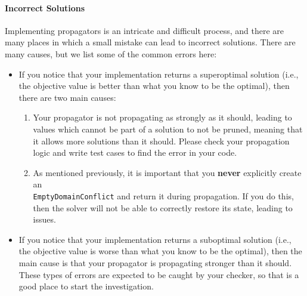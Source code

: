 \documentclass{article}
\begin{document}
    \paragraph*{Incorrect Solutions}
        Implementing propagators is an intricate and difficult process, and there are many places in which a small mistake can lead to incorrect solutions.
        There are many causes, but we list some of the common errors here:
        \begin{itemize}
            \item
                If you notice that your implementation returns a superoptimal solution (i.e., the objective value is better than what you know to be the optimal), then there are two main causes:
                \begin{enumerate}
                    \item 
                        Your propagator is not propagating as strongly as it should, leading to values which cannot be part of a solution to not be pruned, meaning that it allows more solutions than it should.
                        Please check your propagation logic and write test cases to find the error in your code.
                    \item 
                        As mentioned previously, it is important that you \textbf{never} explicitly create an\\ \texttt{EmptyDomainConflict} and return it during propagation.
                        If you do this, then the solver will not be able to correctly restore its state, leading to issues.
                \end{enumerate}
            \item 
                If you notice that your implementation returns a suboptimal solution (i.e., the objective value is worse than what you know to be the optimal), then the main cause is that your propagator is propagating stronger than it should. These types of errors are expected to be caught by your checker, so that is a good place to start the investigation.
        \end{itemize}
\end{document}
